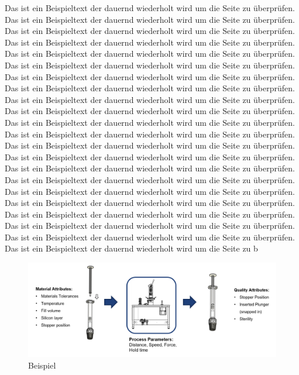 Das ist ein Beispieltext der dauernd wiederholt wird um die Seite zu überprüfen. Das ist ein Beispieltext der dauernd wiederholt wird um die Seite zu überprüfen. Das ist ein Beispieltext der dauernd wiederholt wird um die Seite zu überprüfen. Das ist ein Beispieltext der dauernd wiederholt wird um die Seite zu überprüfen. Das ist ein Beispieltext der dauernd wiederholt wird um die Seite zu überprüfen. Das ist ein Beispieltext der dauernd wiederholt wird um die Seite zu überprüfen. Das ist ein Beispieltext der dauernd wiederholt wird um die Seite zu überprüfen. Das ist ein Beispieltext der dauernd wiederholt wird um die Seite zu überprüfen. Das ist ein Beispieltext der dauernd wiederholt wird um die Seite zu überprüfen. Das ist ein Beispieltext der dauernd wiederholt wird um die Seite zu überprüfen. Das ist ein Beispieltext der dauernd wiederholt wird um die Seite zu überprüfen. Das ist ein Beispieltext der dauernd wiederholt wird um die Seite zu überprüfen. Das ist ein Beispieltext der dauernd wiederholt wird um die Seite zu überprüfen. Das ist ein Beispieltext der dauernd wiederholt wird um die Seite zu überprüfen. Das ist ein Beispieltext der dauernd wiederholt wird um die Seite zu überprüfen. Das ist ein Beispieltext der dauernd wiederholt wird um die Seite zu überprüfen. Das ist ein Beispieltext der dauernd wiederholt wird um die Seite zu überprüfen. Das ist ein Beispieltext der dauernd wiederholt wird um die Seite zu überprüfen. Das ist ein Beispieltext der dauernd wiederholt wird um die Seite zu überprüfen. Das ist ein Beispieltext der dauernd wiederholt wird um die Seite zu überprüfen. Das ist ein Beispieltext der dauernd wiederholt wird um die Seite zu überprüfen. Das ist ein Beispieltext der dauernd wiederholt wird um die Seite zu b

\begin{figure}[htbp]
\begin{center}
	\includegraphics[width=\textwidth]{frontpicture.pdf}
\caption{Beispiel}
\label{abb:007}
\end{center}
\end{figure}

